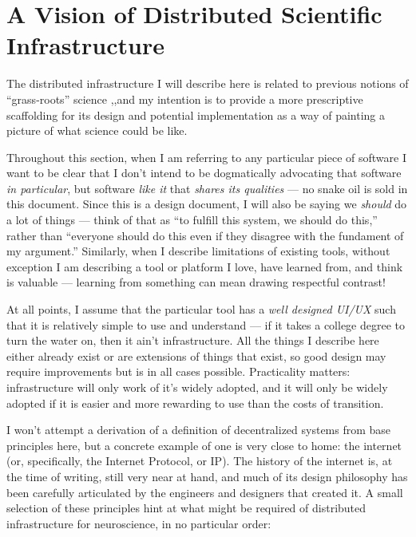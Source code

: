 \documentclass[nohyper]{tufte-book-jls}
\begin{document}
\hypertarget{a-vision-of-distributed-scientific-infrastructure}{%
\section{A Vision of Distributed Scientific
Infrastructure}\label{a-vision-of-distributed-scientific-infrastructure}}

The distributed infrastructure I will describe here is related to
previous notions of ``grass-roots'' science \cite{mainenBetterWayCrack2016},,and my intention is to provide a more
prescriptive scaffolding for its design and potential implementation as
a way of painting a picture of what science could be like.

Throughout this section, when I am referring to any particular piece of
software I want to be clear that I don't intend to be dogmatically
advocating that software \emph{in particular}, but software \emph{like
it} that \emph{shares its qualities} --- no snake oil is sold in this
document. Since this is a design document, I will also be saying we
\emph{should} do a lot of things --- think of that as ``to fulfill this
system, we should do this,'' rather than ``everyone should do this even
if they disagree with the fundament of my argument.'' Similarly, when I
describe limitations of existing tools, without exception I am
describing a tool or platform I love, have learned from, and think is
valuable --- learning from something can mean drawing respectful
contrast!

At all points, I assume that the particular tool has a \emph{well
designed UI/UX} such that it is relatively simple to use and understand
--- if it takes a college degree to turn the water on, then it ain't
infrastructure. All the things I describe here either already exist or
are extensions of things that exist, so good design may require
improvements but is in all cases possible. Practicality matters:
infrastructure will only work of it's widely adopted, and it will only
be widely adopted if it is easier and more rewarding to use than the
costs of transition.

I won't attempt a derivation of a definition of decentralized systems
from base principles here, but a concrete example of one is very close
to home: the internet (or, specifically, the Internet Protocol, or IP).
The history of the internet is, at the time of writing, still very near
at hand, and much of its design philosophy has been carefully
articulated by the engineers and designers that created it. A small
selection of these principles hint at what might be required of
distributed infrastructure for neuroscience, in no particular order:
\end{document}
